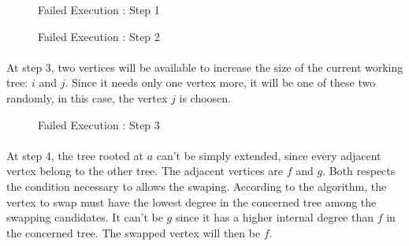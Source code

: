 \begin{figure}[H]
  \caption{Failed Execution : Step 1}
  \begin{center}
    \begin{tikzpicture}[scale=0.9,transform shape]
      
    \end{tikzpicture}
  \end{center}
\end{figure}

\begin{figure}[H]
  \caption{Failed Execution : Step 2}
  \begin{center}
    \begin{tikzpicture}[scale=0.9,transform shape]
      
    \end{tikzpicture}
  \end{center}
\end{figure}

\paragraph{}
At step 3, two vertices will be available to increase the size of the current
working tree: $i$ and $j$. Since it needs only one vertex more, it will be
one of these two randomly, in this case, the vertex $j$ is choosen.

\begin{figure}[H]
  \caption{Failed Execution : Step 3}
  \begin{center}
    \begin{tikzpicture}[scale=0.9,transform shape]
      
    \end{tikzpicture}
  \end{center}
\end{figure}

\paragraph{}
At step 4, the tree rooted at $a$ can't be simply extended, since every
adjacent vertex belong to the other tree. The adjacent vertices are $f$ and
$g$. Both respects the condition necessary to allows the swaping. According to
the algorithm, the vertex to swap must have the lowest degree in the concerned
tree among the swapping candidates. It can't be $g$ since it has a higher
internal degree than $f$ in the concerned tree. The swapped vertex will then be
$f$.

